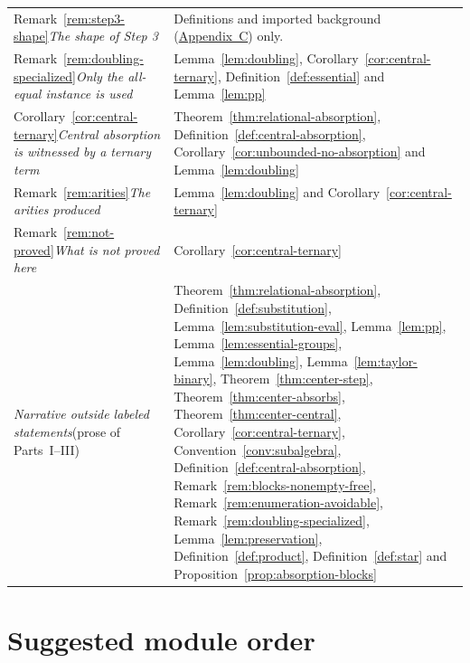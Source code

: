 \documentclass[11pt]{article}
\theoremstyle{mainplain}
\theoremstyle{mainroman}
\theoremstyle{definition}
\numberwithin{equation}{section}
\begin{document}
\begin{longtable}{@{}>{\raggedright\arraybackslash}p{}>{\raggedright\arraybackslash}p{}@{}}
Remark~\ref{rem:step3-shape}\newline\emph{The shape of Step 3} & Definitions and imported background (\hyperref[app:background]{Appendix~C}) only. \\
Remark~\ref{rem:doubling-specialized}\newline\emph{Only the all-equal instance is used} & Lemma~\ref{lem:doubling}, Corollary~\ref{cor:central-ternary}, Definition~\ref{def:essential} and Lemma~\ref{lem:pp} \\
Corollary~\ref{cor:central-ternary}\newline\emph{Central absorption is witnessed by a ternary term} & Theorem~\ref{thm:relational-absorption}, Definition~\ref{def:central-absorption}, Corollary~\ref{cor:unbounded-no-absorption} and Lemma~\ref{lem:doubling} \\
Remark~\ref{rem:arities}\newline\emph{The arities produced} & Lemma~\ref{lem:doubling} and Corollary~\ref{cor:central-ternary} \\
Remark~\ref{rem:not-proved}\newline\emph{What is \emph{not} proved here} & Corollary~\ref{cor:central-ternary} \\
\emph{Narrative outside labeled statements}\newline(prose of Parts~I--III) & Theorem~\ref{thm:relational-absorption}, Definition~\ref{def:substitution}, Lemma~\ref{lem:substitution-eval}, Lemma~\ref{lem:pp}, Lemma~\ref{lem:essential-groups}, Lemma~\ref{lem:doubling}, Lemma~\ref{lem:taylor-binary}, Theorem~\ref{thm:center-step}, Theorem~\ref{thm:center-absorbs}, Theorem~\ref{thm:center-central}, Corollary~\ref{cor:central-ternary}, Convention~\ref{conv:subalgebra}, Definition~\ref{def:central-absorption}, Remark~\ref{rem:blocks-nonempty-free}, Remark~\ref{rem:enumeration-avoidable}, Remark~\ref{rem:doubling-specialized}, Lemma~\ref{lem:preservation}, Definition~\ref{def:product}, Definition~\ref{def:star} and Proposition~\ref{prop:absorption-blocks} \\
\end{longtable}

\section{Suggested module order}\label{app:module-order}
\end{document}

